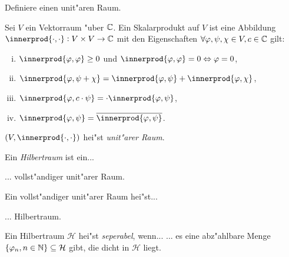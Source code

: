 \documentclass[9pt]{article}
\newcommand{\C}[1]{%
	\ifthenelse{\equal{#1}{}}
	{\mathbb{C}}
	{\mathbb{C}^{#1}}}%
\DeclarePairedDelimiter{\innerprod}\langle\rangle
\newcommand{\Hi}{\mathcal{H}}
\newenvironment{field}{}{\newpage}
\newif\ifnote
\newenvironment{note}{\notetrue}{\notefalse}
\newcommand{\localtag}{}
\newcommand{\globaltag}{}
\newcommand{\uuid}{}
\newcommand{\tags}[1]{
    \ifnote 
        \renewcommand{\localtag}{#1}
    \else
        \renewcommand{\globaltag}{#1}
    \fi 
    }
\newcommand{\xplain}[1]{\renewcommand{\uuid}{#1}}
\begin{document}
\begin{note}
	\xplain{72ba8d20-f588-492b-a6d4-6c3a8cfd48e4}
	\tags{definition, skalarprodukt, hilbertraum, 5.2}
	
	\begin{field}  %
		Definiere einen unit"aren Raum.
	\end{field}
	
	\begin{field}  %
		Sei $V$ ein Vektorraum "uber $\C{}$. Ein Skalarprodukt auf $V$ ist eine Abbildung $\innerprod{\cdot, \cdot}: V \times V \rightarrow \C{}$ mit den Eigenschaften 
		$\forall \varphi, \psi, \chi \in V, c \in \C{}$ gilt:
		\begin{enumerate}[i)]
			\item $\innerprod{\varphi,\varphi} \geq 0$ und $\innerprod{\varphi,\varphi} = 0 \Leftrightarrow \varphi = 0$,
			\item $\innerprod{\varphi, \psi + \chi} = \innerprod{\varphi,\psi} + \innerprod{\varphi,\chi}$,
			\item $\innerprod{\varphi, c \cdot \psi}= \cdot \innerprod{\varphi, \psi}$,
			\item $\innerprod{\varphi, \psi} = \overline{\innerprod{\varphi,\psi}}$.
		\end{enumerate}
	
	$(V, \innerprod{\cdot, \cdot})$ hei"st \textit{unit"arer Raum}.
	\end{field}

	\begin{field}  %
		Ein \textit{Hilbertraum} ist ein...
	\end{field}
	
	\begin{field}  %
		... vollst"andiger unit"arer Raum.
	\end{field}
	
	\begin{field}  %
		Ein vollst"andiger unit"arer Raum hei"st...
	\end{field}
	
	\begin{field}  %
		... Hilbertraum. 
	\end{field}
		
	\begin{field}  %
		Ein Hilbertraum $\Hi$ hei"st \textit{seperabel}, wenn...
	\end{field}
	\begin{field}  %
		... es eine abz"ahlbare Menge
		$\qty{\varphi_n, n\in \mathbb{N}} \subseteq \Hi$ gibt, die dicht in $\Hi$ liegt.

	\end{field}
\end{note}
\end{document}
